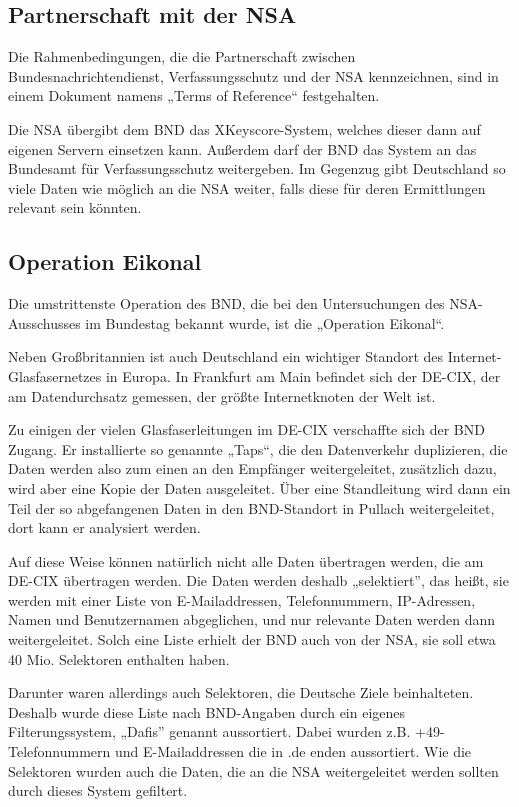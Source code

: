 \documentclass[12pt,a4paper]{scrartcl}
\begin{document}
\subsection{Partnerschaft mit der NSA}
Die Rahmenbedingungen, die die Partnerschaft zwischen Bundesnachrichtendienst, Verfassungsschutz und der NSA kennzeichnen, sind in einem Dokument namens „Terms of Reference“ festgehalten.

Die NSA übergibt dem BND das XKeyscore-System, welches dieser dann auf eigenen Servern einsetzen kann. Außerdem darf der BND das System an das Bundesamt für Verfassungsschutz weitergeben. Im Gegenzug gibt Deutschland so viele Daten wie möglich an die NSA weiter, falls diese für deren Ermittlungen relevant sein könnten.

\subsection{Operation Eikonal}
Die umstrittenste Operation des BND, die bei den Untersuchungen des NSA-Ausschusses im Bundestag bekannt wurde, ist die „Operation Eikonal“.

Neben Großbritannien ist auch Deutschland ein wichtiger Standort des Internet-Glasfasernetzes in Europa. In Frankfurt am Main befindet sich der DE-CIX, der am Datendurchsatz gemessen, der größte Internetknoten der Welt ist.

Zu einigen der vielen Glasfaserleitungen im DE-CIX verschaffte sich der BND Zugang. Er installierte so genannte „Taps“, die den Datenverkehr duplizieren, die Daten werden also zum einen an den Empfänger weitergeleitet, zusätzlich dazu, wird aber eine Kopie der Daten ausgeleitet. Über eine Standleitung wird dann ein Teil der so abgefangenen Daten in den BND-Standort in Pullach weitergeleitet, dort kann er analysiert werden.

Auf diese Weise können natürlich nicht alle Daten übertragen werden, die am DE-CIX übertragen werden. Die Daten werden deshalb „selektiert”, das heißt, sie werden mit einer Liste von E-Mailaddressen, Telefonnummern, IP-Adressen, Namen und Benutzernamen abgeglichen, und nur relevante Daten werden dann weitergeleitet. Solch eine Liste erhielt der BND auch von der NSA, sie soll etwa 40 Mio. Selektoren enthalten haben.

Darunter waren allerdings auch Selektoren, die Deutsche Ziele beinhalteten. Deshalb wurde diese Liste nach BND-Angaben durch ein eigenes Filterungssystem, „Dafis” genannt aussortiert. Dabei wurden z.B. +49-Telefonnummern und E-Mailaddressen die in .de enden aussortiert. Wie die Selektoren wurden auch die Daten, die an die NSA weitergeleitet werden sollten durch dieses System gefiltert.
\end{document}
